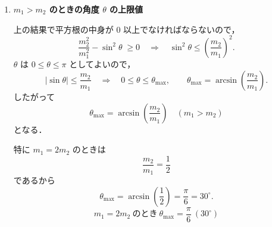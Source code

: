\documentclass[a4paper,12pt]{jlreq}
\begin{document}
\begin{enumerate}
  よって，衝突後の物体1の速さは
  \begin{equation}
    \boxed{
    v_1'
      = \frac{m_1}{M} v_1
        \left(
          \cos\theta
          \pm \sqrt{\frac{m_2^2}{m_1^2} - \sin^2\theta}
        \right),
    \qquad M = m_1 + m_2
    }
  \end{equation}
  となる．（$\pm$ は散乱の枝の違いに対応する．）

  \item \textbf{$m_1>m_2$ のときの角度 $\theta$ の上限値}

  上の結果で平方根の中身が 0 以上でなければならないので，
  \[
    \frac{m_2^2}{m_1^2} - \sin^2\theta \;\ge 0
    \quad\Longrightarrow\quad
    \sin^2\theta \le \left(\frac{m_2}{m_1}\right)^2.
  \]
  $\theta$ は $0\le\theta\le\pi$ としてよいので，
  \[
    |\sin\theta| \le \frac{m_2}{m_1}
    \quad\Longrightarrow\quad
    0 \le \theta \le \theta_{\max},
    \qquad
    \theta_{\max} = \arcsin\!\left(\frac{m_2}{m_1}\right).
  \]
  したがって
  \begin{equation}
    \boxed{
      \displaystyle
      \theta_{\max}
      = \arcsin\!\left(\frac{m_2}{m_1}\right)
      \quad (m_1>m_2)
    }
  \end{equation}
  となる．

  特に $m_1 = 2m_2$ のときは
  \[
    \frac{m_2}{m_1} = \frac12
  \]
  であるから
  \[
    \theta_{\max} = \arcsin\!\left(\frac12\right)
    = \frac{\pi}{6}
    = 30^{\circ}.
  \]
  \begin{equation}
    \boxed{
      m_1 = 2m_2 \ \text{のとき}\ 
      \theta_{\max} = \dfrac{\pi}{6} \ (30^\circ)
    }
  \end{equation}

\end{enumerate}
\end{document}
